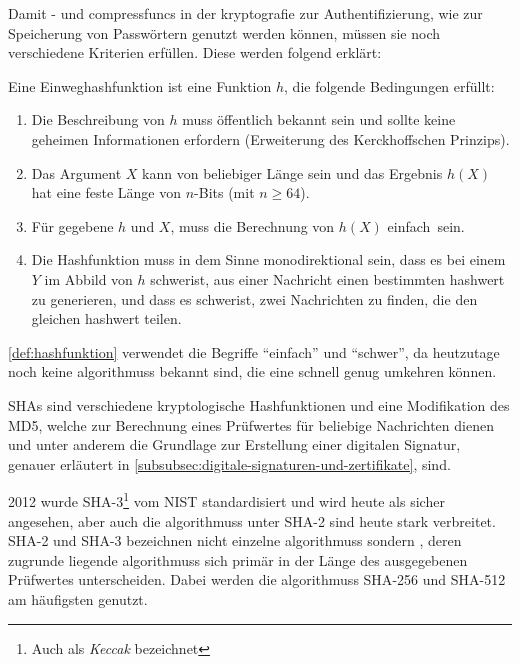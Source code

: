 Damit - und \glspl{compressfunc} in der \gls{kryptografie} zur Authentifizierung, wie \zb zur Speicherung von Passwörtern genutzt werden können, müssen sie noch verschiedene Kriterien erfüllen.
Diese werden folgend erklärt:

\begin{definition}\label{def:hashfunktion}
    Eine Einweghashfunktion ist eine Funktion $h$, die folgende Bedingungen erfüllt\autocite[\vglf][\pagef~17]{anal-des-hash-function-2003}:
    \begin{enumerate}
        \item Die Beschreibung von $h$ muss öffentlich bekannt sein und sollte keine geheimen Informationen erfordern (Erweiterung des Kerckhoff\textquotesingle schen Prinzips\autocite[]{petitcolas-information-nodate}).
        \item Das Argument $X$ kann von beliebiger Länge sein und das Ergebnis $h(X)$ hat eine feste Länge von $n$-Bits (mit $n \geq64$).
        \item Für gegebene $h$ und $X$, muss die Berechnung von $h(X)$ einfach\footnotemark\ sein.
        \item Die Hashfunktion muss in dem Sinne monodirektional sein, dass es bei einem $Y$ im Abbild von $h$ schwer\footnotemark[\value{footnote}] ist, aus einer Nachricht einen bestimmten \gls{hashwert} zu generieren, und dass es schwer\footnotemark[\value{footnote}] ist, zwei Nachrichten zu finden, die den gleichen \gls{hashwert} teilen.
    \end{enumerate}
\end{definition}

\autoref{def:hashfunktion} verwendet die Begriffe \enquote{einfach} und \enquote{schwer}, da heutzutage noch keine \glspl{algorithmus} bekannt sind, die eine  schnell genug umkehren können.\autocite[\pagef~234]{buchmann-einfuhrung-2016}

\acfp{SHA} sind verschiedene kryptologische Hashfunktionen und eine Modifikation des \gls{MD5}, welche zur Berechnung eines Prüfwertes für beliebige Nachrichten dienen und unter anderem die Grundlage zur Erstellung einer digitalen Signatur, genauer erläutert in \autoref{subsubsec:digitale-signaturen-und-zertifikate}, sind\autocite[]{WhatisSH81:online}.

2012 wurde \ac{SHA}-3\footnote{Auch als \textit{Keccak} bezeichnet}  vom \ac{NIST} standardisiert und wird heute als sicher angesehen\autocite[\pagef~239]{buchmann-einfuhrung-2016}, aber auch die \glspl{algorithmus} unter \ac{SHA}-2 sind heute stark verbreitet.
\ac{SHA}-2 und \ac{SHA}-3 bezeichnen nicht einzelne \glspl{algorithmus} sondern , deren zugrunde liegende \glspl{algorithmus} sich primär in der Länge des ausgegebenen Prüfwertes unterscheiden.
Dabei werden die \glspl{algorithmus} \ac{SHA}-256 und \ac{SHA}-512 am häufigsten genutzt.